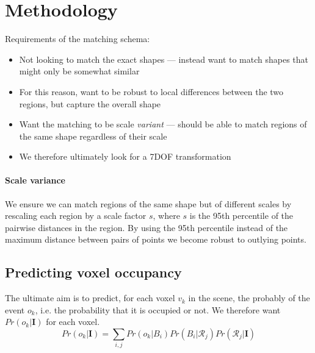 \documentclass[10pt,a4paper, twocolumn]{article}
\makeatletter
\newcommand*{\ie}{i.e.\@\xspace}
\newcommand{\prob}{Pr}
\newcommand{\rgbdimage}{\mathbf{I}}
\newcommand{\imregion}{\mathcal{R}}
\newcommand{\occ}{o}
\newcommand{\basisshape}{B}
\makeatother
\begin{document}




\section{Methodology}

Requirements of the matching schema:
\begin{itemize}
\item Not looking to match the exact shapes --- instead want to match shapes that might only be somewhat similar
\item For this reason, want to be robust to local differences between the two regions, but capture the overall shape
\item Want the matching to be scale \emph{variant} --- should be able to match regions of the same shape regardless of their scale 
\item We therefore ultimately look for a 7DOF transformation
\end{itemize}

\paragraph{Scale variance}
We ensure we can match regions of the same shape but of different scales by rescaling each region by a scale factor $s$, where $s$ is the 95th percentile of the pairwise distances in the region. 
By using the 95th percentile instead of the maximum distance between pairs of points we become robust to outlying points.

\subsection{Predicting voxel occupancy}
The ultimate aim is to predict, for each voxel $v_k$ in the scene, the probably of the event $\occ_k$, \ie the probability that it is occupied or not. 
We therefore want $\prob(\occ_k | \rgbdimage)$ for each voxel.
$$
\prob(\occ_k | \rgbdimage) = \sum_{i,j} \prob(\occ_k|\basisshape_i)\prob(\basisshape_i|\imregion_j)\prob(\imregion_j|\rgbdimage)
$$
\end{document}
